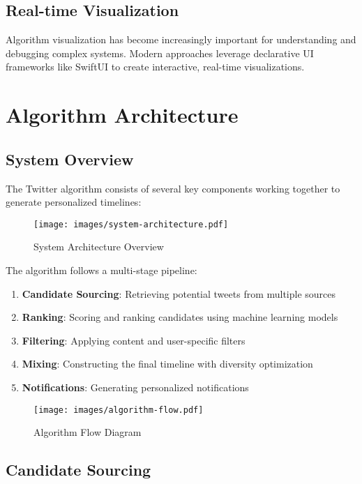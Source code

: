 \documentclass[11pt,a4paper]{article}
\begin{document}
\subsection{Real-time Visualization}

Algorithm visualization has become increasingly important for understanding and debugging complex systems. Modern approaches leverage declarative UI frameworks like SwiftUI to create interactive, real-time visualizations.

\section{Algorithm Architecture}

\subsection{System Overview}

The Twitter algorithm consists of several key components working together to generate personalized timelines:

\begin{figure}[H]
    \centering
    \texttt{[image: images/system-architecture.pdf]}
    \caption{System Architecture Overview}
    \label{fig:system-architecture}
\end{figure}

The algorithm follows a multi-stage pipeline:
\begin{enumerate}
    \item \textbf{Candidate Sourcing}: Retrieving potential tweets from multiple sources
    \item \textbf{Ranking}: Scoring and ranking candidates using machine learning models
    \item \textbf{Filtering}: Applying content and user-specific filters
    \item \textbf{Mixing}: Constructing the final timeline with diversity optimization
    \item \textbf{Notifications}: Generating personalized notifications
\end{enumerate}

\begin{figure}[H]
    \centering
    \texttt{[image: images/algorithm-flow.pdf]}
    \caption{Algorithm Flow Diagram}
    \label{fig:algorithm-flow}
\end{figure}

\subsection{Candidate Sourcing}
\end{document}
